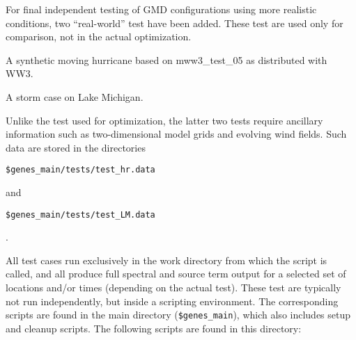 \documentclass[12pt]{article}
\newcommand{\ws}{WW3}
\newcommand{\file}{\sf}
\newcommand{\code}{\tt}
\newenvironment{flist}{\begin{list}{nofile ?}{\parsep 0mm
            \itemsep 0mm \leftmargin 35mm \labelwidth 25mm
            \rightmargin 10mm}}{\end{list}}
\newcommand{\fit}[2]{\item[{\file{#1}}\hfill]{#2}}
\begin{document}
\noindent
For final independent testing of GMD configurations using more realistic
conditions, two ``real-world'' test have been added. These test are used only
for comparison, not in the actual optimization.

\begin{flist}
\fit{test\_hr}{A synthetic moving hurricane based on {\file
               mww3\_test\_05} as distributed with \ws.}
\fit{test\_LM}{A storm case on Lake Michigan.}
\end{flist}

\noindent
Unlike the test used for optimization, the latter two tests require ancillary
information such as two-dimensional model grids and evolving wind fields. Such
data are stored in the directories \\
\centerline{\code \$genes\_main/tests/test\_hr.data}
\noindent and \\
\centerline{\code \$genes\_main/tests/test\_LM.data}.

\vspace{\baselineskip}
\noindent
All test cases run exclusively in the work directory from which the script is
called, and all produce full spectral and source term output for a selected
set of locations and/or times (depending on the actual test). These test are
typically not run independently, but inside a scripting environment. The
corresponding scripts are found in the main directory ({\code \$genes\_main}),
which also includes setup and cleanup scripts. The following scripts are found
in this directory:
\end{document}
